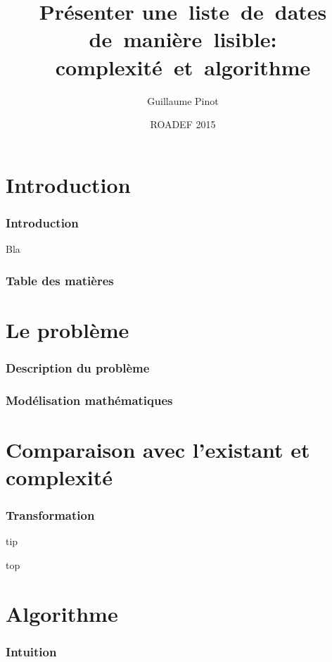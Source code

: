\documentclass{beamer}
\title[Présenter une~liste~de~dates de~manière~lisible]
{Présenter une~liste~de~dates de~manière~lisible:
  complexité~et~algorithme}
\author{Guillaume Pinot}
\institute[Canal TP] %
{
  Canal TP\\
  20 rue Hector Malot\\
  75012 Paris, France\\
  \texttt{guillaume.pinot@canaltp.fr}}
\date{ROADEF 2015}
\begin{document}
\begin{frame}
  \titlepage    
\end{frame}

\section*{Introduction}

\begin{frame}
  \frametitle{Introduction}

  Bla
\end{frame}

\begin{frame}%
  \frametitle{Table des matières}
  \tableofcontents[hideallsubsections]
\end{frame}

\section{Le problème}

\begin{frame}
  \frametitle{Description du problème}

\end{frame}

\begin{frame}
  \frametitle{Modélisation mathématiques}

  \cite{hamming1950error} 
\end{frame}

\section{Comparaison avec l'existant et complexité}

\begin{frame}[allowframebreaks]
  \frametitle{Transformation}

  tip \cite{lanctot2003distinguishing}

  \framebreak

  top \cite{ma2008more}
\end{frame}

\section{Algorithme}

\begin{frame}
  \frametitle{Intuition}

\end{frame}
\end{document}
